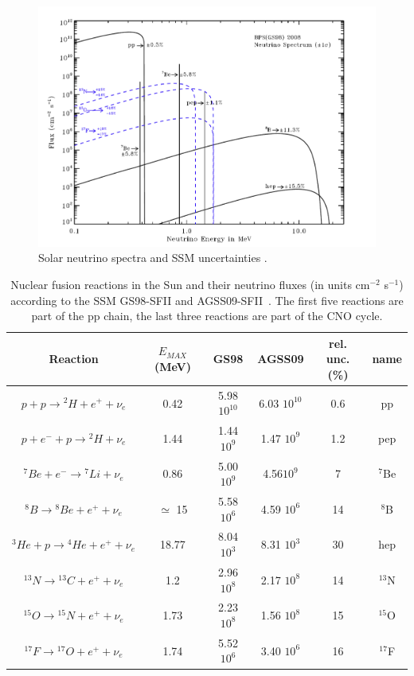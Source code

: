 \begin{figure}[htbp]
\centering
\includegraphics[width=0.6\linewidth]{figures/nu_spectrum1.pdf}
  \caption{
Solar neutrino spectra and SSM uncertainties \cite{serenellif}. 
}
 \label{fig:sol-spectra}
 \end{figure}

\begin{table}
\caption{Nuclear fusion reactions in the Sun and their neutrino fluxes (in units cm$^{-2}$ s$^{-1}$) according to the SSM GS98-SFII and AGSS09-SFII~\cite{serenelli}. The first five reactions are part of the pp chain, the last three reactions are part of the CNO cycle.}
\centering
\begin{tabular}{|c|c|c|c|c|c|}
  \hline
  Reaction & $E_{MAX}$ (MeV) & GS98 & AGSS09& rel. unc. (\%) &name \\ 
  \hline
$ p + p \rightarrow {^2}H + e ^+ + \nu_e$ & 0.42 & 5.98 $10^{10}$ & 6.03    $10^{10}$ & 0.6 &pp \\
$ p + e^- + p \rightarrow {^2}H  + \nu_e$ & 1.44 & 1.44 $10^{9}$ &1.47 $10^{9}$  & 1.2 &pep \\
$ {^7}Be + e^- \rightarrow {^7}Li + \nu_e$ & 0.86 & 5.00  $10^{9}$ &4.56$10^{9}$  & 7 &$ {^7}$Be \\
$ {^8}B \rightarrow {^8}Be + e ^+ + \nu_e$ & $\simeq$ 15 & 5.58 $10^{6}$ &4.59    $10^{6}$  & 14 &$ {^8}$B\\
$  {^3}He + p \rightarrow {^4}He + e ^+ + \nu_e$ & 18.77 & 8.04 $10^{3}$ &8.31 $10^{3}$  & 30 &hep \\
$ {^{13}}N \rightarrow {^{13}}C + e ^+ + \nu_e$ & 1.2 & 2.96 $10^{8}$&2.17    $10^{8}$  &14  &$ {^{13}}$N\\
$ {^{15}}O \rightarrow {^{15}}N + e ^+ + \nu_e$ & 1.73 & 2.23 $10^{8}$&1.56    $10^{8}$  & 15& $ {^{15}}$O\\
$ {^{17}}F \rightarrow {^{17}}O + e ^+ + \nu_e$ & 1.74 & 5.52 $10^{6}$ &3.40   $10^{6}$  & 16 &$ {^{17}}$F\\
  \hline
\end{tabular}
\label{tab:snuflux}
\end{table}


